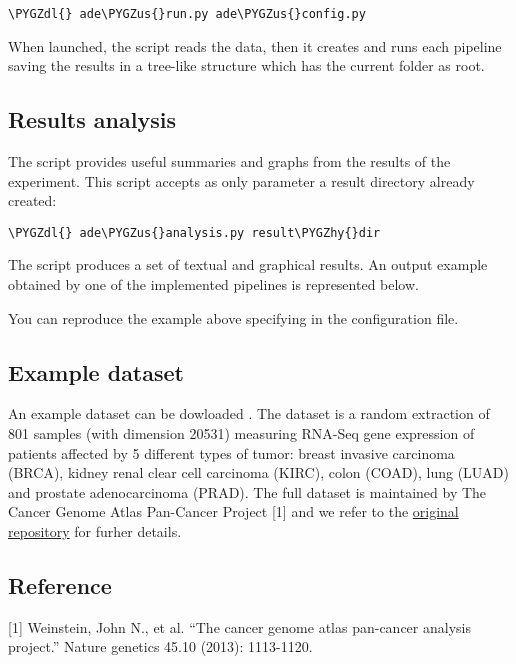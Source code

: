 \documentclass[letterpaper,10pt,english]{sphinxmanual}
\def\PYGZus{\char`\_}
\def\PYGZdl{\char`\$}
\def\PYGZhy{\char`\-}
\begin{document}
\begin{Verbatim}[commandchars=\\\{\}]
\PYGZdl{} ade\PYGZus{}run.py ade\PYGZus{}config.py
\end{Verbatim}

When launched, the script reads the data, then it creates and runs each pipeline saving the results in a tree-like structure which has the current folder as root.


\subsection{Results analysis}
\label{tutorial:results-analysis}\label{tutorial:analysis}
The  script provides useful summaries and graphs from the results of the experiment. This script accepts as only parameter a result directory
already created:

\begin{Verbatim}[commandchars=\\\{\}]
\PYGZdl{} ade\PYGZus{}analysis.py result\PYGZhy{}dir
\end{Verbatim}

The script produces a set of textual and graphical results. An output example obtained by one of the implemented pipelines is represented below.

\noindent{}

\noindent{}

You can reproduce the example above specifying  in the configuration file.


\subsection{Example dataset}
\label{tutorial:example-dataset}
An example dataset can be dowloaded . The dataset is a random extraction of 801 samples (with dimension 20531) measuring RNA-Seq gene expression of patients affected by 5 different types of tumor: breast invasive carcinoma (BRCA), kidney renal clear cell carcinoma (KIRC), colon  (COAD), lung  (LUAD) and prostate adenocarcinoma (PRAD). The full dataset is maintained by The Cancer Genome Atlas Pan-Cancer Project {[}1{]} and we refer to the \href{https://www.synapse.org/\#!Synapse:syn4301332}{original repository} for furher details.


\subsection{Reference}
\label{tutorial:reference}
{[}1{]} Weinstein, John N., et al. ``The cancer genome atlas pan-cancer analysis project.'' Nature genetics 45.10 (2013): 1113-1120.
\end{document}
